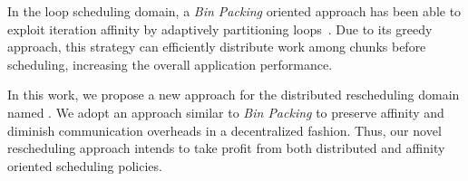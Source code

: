 In the loop scheduling domain, a \textit{Bin Packing} oriented approach has been able to exploit iteration affinity by adaptively partitioning loops~\cite{Castro-Penna-WSCAD:2017}.
Due to its greedy approach, this strategy can efficiently distribute work among chunks before scheduling, increasing the overall application performance.

In this work, we propose a new approach for the distributed rescheduling domain named \packdrop.
We adopt an approach similar to \textit{Bin Packing} to preserve affinity and diminish communication overheads in a decentralized fashion.
Thus, our novel rescheduling approach intends to take profit from both distributed and affinity oriented scheduling policies.
